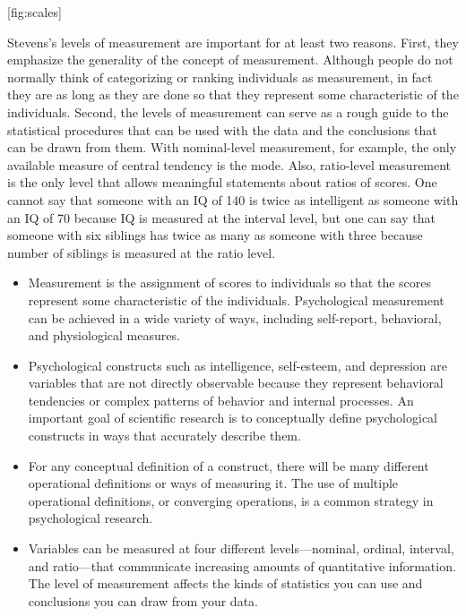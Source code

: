 \documentclass[]{book}
\theoremstyle{definition}
\theoremstyle{definition}
\theoremstyle{remark}
\begin{document}
{[}fig:scales{]}

Stevens's levels of measurement are important for at least two reasons.
First, they emphasize the generality of the concept of measurement.
Although people do not normally think of categorizing or ranking
individuals as measurement, in fact they are as long as they are done so
that they represent some characteristic of the individuals. Second, the
levels of measurement can serve as a rough guide to the statistical
procedures that can be used with the data and the conclusions that can
be drawn from them. With nominal-level measurement, for example, the
only available measure of central tendency is the mode. Also,
ratio-level measurement is the only level that allows meaningful
statements about ratios of scores. One cannot say that someone with an
IQ of 140 is twice as intelligent as someone with an IQ of 70 because IQ
is measured at the interval level, but one can say that someone with six
siblings has twice as many as someone with three because number of
siblings is measured at the ratio level.

\begin{itemize}
\item
  Measurement is the assignment of scores to individuals so that the
  scores represent some characteristic of the individuals. Psychological
  measurement can be achieved in a wide variety of ways, including
  self-report, behavioral, and physiological measures.
\item
  Psychological constructs such as intelligence, self-esteem, and
  depression are variables that are not directly observable because they
  represent behavioral tendencies or complex patterns of behavior and
  internal processes. An important goal of scientific research is to
  conceptually define psychological constructs in ways that accurately
  describe them.
\item
  For any conceptual definition of a construct, there will be many
  different operational definitions or ways of measuring it. The use of
  multiple operational definitions, or converging operations, is a
  common strategy in psychological research.
\item
  Variables can be measured at four different levels---nominal, ordinal,
  interval, and ratio---that communicate increasing amounts of
  quantitative information. The level of measurement affects the kinds
  of statistics you can use and conclusions you can draw from your data.
\end{itemize}
\end{document}
